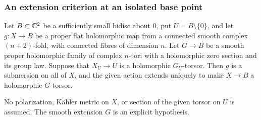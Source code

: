 \subsubsection*{An extension criterion at an isolated base point}

\begin{proposition}
Let $B\subset\mathbb C^2$ be a sufficiently small bidisc about $0$, put
$U=B\setminus\{0\}$, and let $g:X\to B$ be a proper flat
holomorphic map from a connected smooth complex $(n+2)$-fold,
with connected fibres of dimension $n$.  Let $G\to B$ be a
smooth proper holomorphic family of complex $n$-tori with a
holomorphic zero section and its group law.  Suppose that
$X_U\to U$ is a holomorphic $G_U$-torsor.  Then $g$ is a
submersion on all of $X$, and the given action extends uniquely
to make $X\to B$ a holomorphic $G$-torsor.

No polarization, K\"ahler metric on $X$, or section of the
given torsor on $U$ is assumed.  The smooth extension $G$ is
an explicit hypothesis.
\end{proposition}
